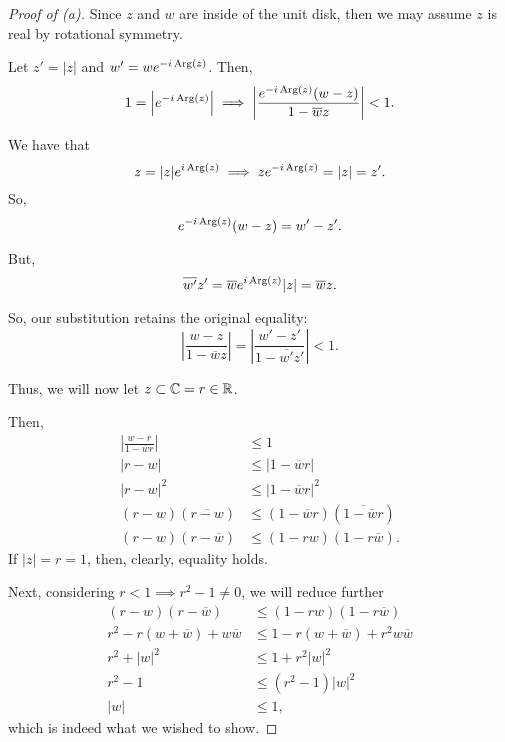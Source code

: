 \documentclass[../hw1]{subfiles}
\begin{document}
\begin{proof}[Proof of (a)]
	Since $z$ and $w$ are inside of the unit disk, then we may assume  $z$ is real by rotational symmetry.

	Let $z' = |z|$ and  $w' = we^{-i\operatorname{Arg}(z)}$. Then, \[
		1=\left| e^{-i\operatorname{Arg}(z)} \right|  \implies \left| \frac{e^{-i\operatorname{Arg}(z)}(w-z)}{1-\overline{w}z} \right| < 1
		.\]

	We have that \[
		z = |z|e^{i\operatorname{Arg}(z)} \implies ze^{-i\operatorname{Arg}(z)}=|z|=z'
		.\]
	So, \[
		e^{-i\operatorname{Arg}(z)}(w-z)=w'-z'
		.\]

	But,  \[
		\overline{w'}z' = \overline{w}e^{i\operatorname{Arg}(z)}|z| = \overline{w}z
		.\]

	So, our substitution retains the original equality: \[
		\left| \frac{w-z}{1-\overline{w}z} \right| = \left| \frac{w'-z'}{1-\overline{w'}z'}\right| < 1
		.\]

	Thus, we will now let $z\subset \mathbb{C} = r \in \mathbb{R}$.

	Then,
	\begin{align*}
		\left| \frac{w-r}{1-\overline{w}r} \right| & \le 1                                             \\
		|r-w|                                      & \le |1-\overline{w}r|                             \\
		|r-w|^2                                    & \le |1-\overline{w}r|^2                           \\
		(r-w)(\overline{r-w})                      & \le (1-\overline{w}r)(\overline{1-\overline{w}r}) \\
		(r-w)(r-\overline{w})                      & \le (1-rw)(1-r\overline{w})
		.\end{align*}
	If $|z|=r=1$, then, clearly, equality holds.

	Next, considering $r<1 \implies r^2-1 \neq 0$, we will reduce further
	\begin{align*}
		(r-w)(r-\overline{w})               & \le (1-rw)(1-r\overline{w})              \\
		r^2-r(w+\overline{w})+w\overline{w} & \le 1-r(w+\overline{w})+r^2w\overline{w} \\
		r^2+|w|^2                           & \le 1+r^2|w|^2                           \\
		r^2-1                               & \le (r^2-1)|w|^2                         \\
		|w|                                 & \le 1
		,\end{align*}
	which is indeed what we wished to show.
\end{proof}
\end{document}
